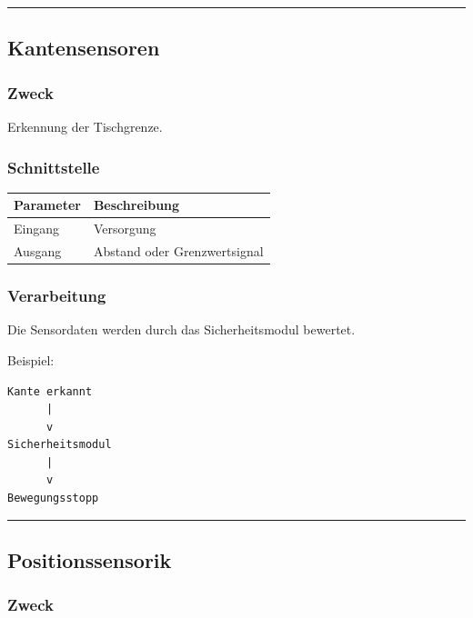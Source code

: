 \documentclass[
  a4paper,
  12pt,
  DIV=12,        %
  parskip=half,  %
  headings=small %
]{scrartcl}
\theoremstyle{definition}
\theoremstyle{definition}
\begin{document}
\begin{center}\rule{0.5\linewidth}{0.5pt}\end{center}

\subsection{Kantensensoren}\label{kantensensoren}

\subsubsection{Zweck}\label{zweck-1}

Erkennung der Tischgrenze.

\subsubsection{Schnittstelle}\label{schnittstelle-1}

\begin{longtable}[]{@{}ll@{}}
\toprule\noalign{}
Parameter & Beschreibung \\
\midrule\noalign{}
\endhead
\bottomrule\noalign{}
\endlastfoot
Eingang & Versorgung \\
Ausgang & Abstand oder Grenzwertsignal \\
\end{longtable}

\subsubsection{Verarbeitung}\label{verarbeitung}

Die Sensordaten werden durch das Sicherheitsmodul bewertet.

Beispiel:

\begin{verbatim}
Kante erkannt
      |
      v
Sicherheitsmodul
      |
      v
Bewegungsstopp
\end{verbatim}

\begin{center}\rule{0.5\linewidth}{0.5pt}\end{center}

\subsection{Positionssensorik}\label{positionssensorik-2}

\subsubsection{Zweck}\label{zweck-2}
\end{document}
